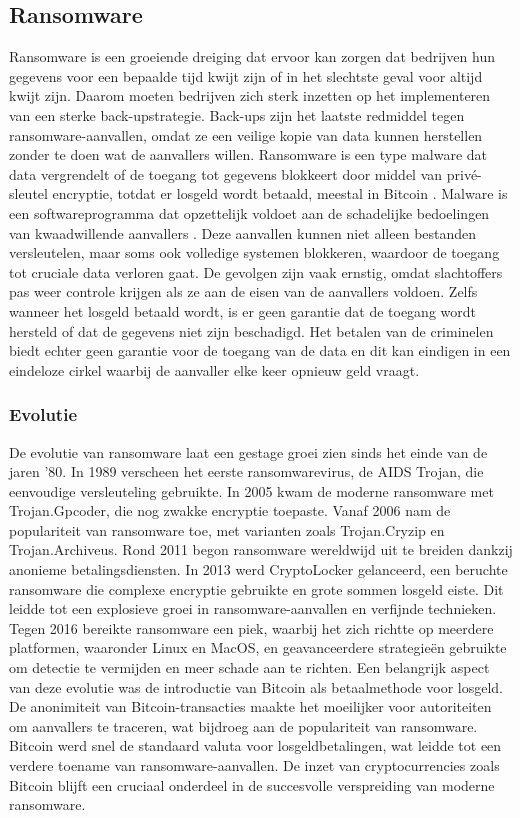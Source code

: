 \subsection{Ransomware}
Ransomware is een groeiende dreiging dat ervoor kan zorgen dat bedrijven hun gegevens voor een bepaalde tijd kwijt zijn of in het slechtste geval voor altijd kwijt zijn. Daarom moeten bedrijven zich sterk inzetten op het implementeren van een sterke back-upstrategie. Back-ups zijn het laatste redmiddel tegen ransomware-aanvallen, omdat ze een veilige kopie van data kunnen herstellen zonder te doen wat de aanvallers willen. Ransomware is een type malware dat data vergrendelt of de toegang tot gegevens blokkeert door middel van privé-sleutel encryptie, totdat er losgeld wordt betaald, meestal in Bitcoin \autocite{Richardson2017}. Malware is een softwareprogramma dat opzettelijk voldoet aan de schadelijke bedoelingen van kwaadwillende aanvallers \autocite{Yanfang2017}. Deze aanvallen kunnen niet alleen bestanden versleutelen, maar soms ook volledige systemen blokkeren, waardoor de toegang tot cruciale data verloren gaat. De gevolgen zijn vaak ernstig, omdat slachtoffers pas weer controle krijgen als ze aan de eisen van de aanvallers voldoen. Zelfs wanneer het losgeld betaald wordt, is er geen garantie dat de toegang wordt hersteld of dat de gegevens niet zijn beschadigd. Het betalen van de criminelen biedt echter geen garantie voor de toegang van de data en dit kan eindigen in een eindeloze cirkel waarbij de aanvaller elke keer opnieuw geld vraagt.
\subsubsection{Evolutie}
De evolutie van ransomware laat een gestage groei zien sinds het einde van de jaren '80. In 1989 verscheen het eerste ransomwarevirus, de AIDS Trojan, die eenvoudige versleuteling gebruikte. In 2005 kwam de moderne ransomware met Trojan.Gpcoder, die nog zwakke encryptie toepaste. Vanaf 2006 nam de populariteit van ransomware toe, met varianten zoals Trojan.Cryzip en Trojan.Archiveus. Rond 2011 begon ransomware wereldwijd uit te breiden dankzij anonieme betalingsdiensten. In 2013 werd CryptoLocker gelanceerd, een beruchte ransomware die complexe encryptie gebruikte en grote sommen losgeld eiste. Dit leidde tot een explosieve groei in ransomware-aanvallen en verfijnde technieken. Tegen 2016 bereikte ransomware een piek, waarbij het zich richtte op meerdere platformen, waaronder Linux en MacOS, en geavanceerdere strategieën gebruikte om detectie te vermijden en meer schade aan te richten. Een belangrijk aspect van deze evolutie was de introductie van Bitcoin als betaalmethode voor losgeld. De anonimiteit van Bitcoin-transacties maakte het moeilijker voor autoriteiten om aanvallers te traceren, wat bijdroeg aan de populariteit van ransomware. Bitcoin werd snel de standaard valuta voor losgeldbetalingen, wat leidde tot een verdere toename van ransomware-aanvallen. De inzet van cryptocurrencies zoals Bitcoin blijft een cruciaal onderdeel in de succesvolle verspreiding van moderne ransomware\autocite{Richardson2017}.
